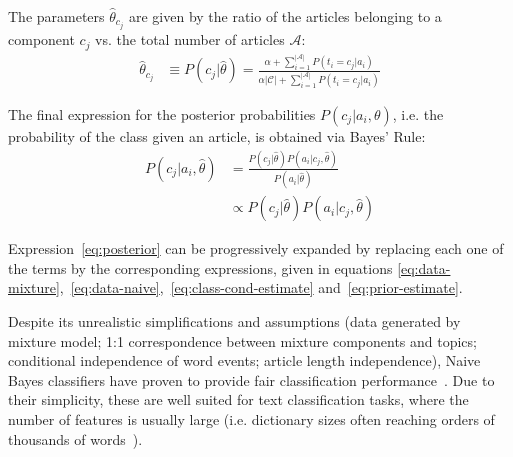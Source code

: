 The parameters $\hat{\theta}_{c_j}$ are given 
by the ratio of the articles belonging to a component $c_j$ vs. the total 
number of articles $\mathcal{A}$:
\begin{equation}
\begin{split}
    \hat{\theta}_{c_j} &\equiv P(c_j|\hat{\theta}) = \frac{\alpha + \sum_{i=1}^{|\mathcal{A}|}P(t_i = c_j|a_i)}{\alpha|\mathcal{C}| + \sum_{i=1}^{|\mathcal{A}|}P(t_i = c_j|a_i)}
    \label{eq:prior-estimate}
\end{split}
\end{equation}




The final expression for the posterior 
probabilities $P(c_j|a_i,\theta)$, i.e. the probability of the class given an 
article, is obtained via Bayes' Rule:
\begin{equation}
\begin{split}
    P(c_j|a_i,\hat{\theta}) &= \frac{P(c_j|\hat{\theta})P(a_i|c_j,\hat{\theta})}{P(a_i|\hat{\theta})}\\
    &\propto P(c_j|\hat{\theta})P(a_i|c_j,\hat{\theta})
    \label{eq:posterior}
\end{split}
\end{equation}

Expression~\ref{eq:posterior} can be progressively expanded by replacing each 
one of the terms by the corresponding expressions, given in equations 
\ref{eq:data-mixture},~\ref{eq:data-naive},~\ref{eq:class-cond-estimate} and~\ref{eq:prior-estimate}.\vertbreak

Despite its unrealistic 
simplifications and assumptions (data generated by mixture model; 1:1 
correspondence between mixture components and topics; conditional independence 
of word events; article length independence), Naive Bayes classifiers have 
proven to provide fair classification 
performance~\cite{McCallum98acomparison,Nigam2000}. Due to their simplicity, 
these are well suited for text classification tasks, where the 
number of features is usually large (i.e. dictionary sizes often reaching orders 
of thousands of words~\cite{McCallum98acomparison}).

